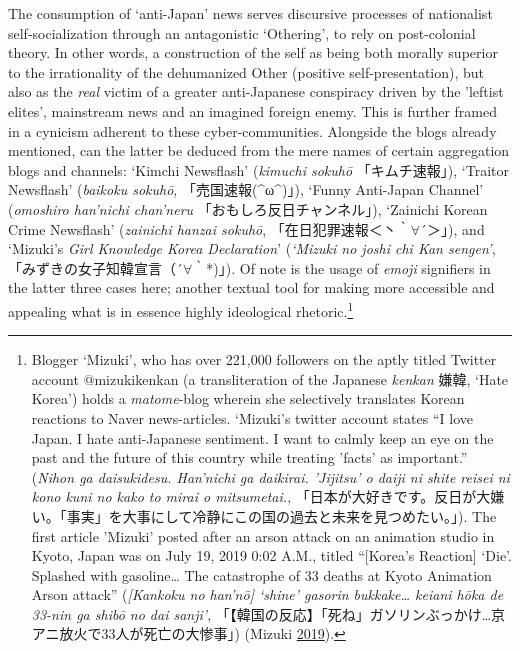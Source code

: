 \documentclass[10pt,british,A4paper,twoside]{memoir}
\begin{document}
The consumption of `anti-Japan' news serves discursive processes of
nationalist self-socialization through an antagonistic `Othering', to
rely on post-colonial theory. In other words, a construction of the self
as being both morally superior to the irrationality of the dehumanized
Other (positive self-presentation), but also as the \emph{real} victim
of a greater anti-Japanese conspiracy driven by the 'leftist elites', mainstream news and an imagined foreign enemy. This is
further framed in a cynicism adherent to these cyber-communities.
Alongside the blogs already mentioned, can the latter be deduced from
the mere names of certain aggregation blogs and channels: `Kimchi
Newsflash' (\emph{kimuchi sokuhō} 「キムチ速報」), `Traitor Newsflash'
(\emph{baikoku sokuhō}, 「売国速報(\^{}ω\^{})」), `Funny Anti-Japan
Channel' (\emph{omoshiro han'nichi chan'neru}
「おもしろ反日チャンネル」), `Zainichi Korean Crime Newsflash'
(\emph{zainichi hanzai sokuhō}, 「在日犯罪速報＜丶｀\(\forall\)´＞」),
and `Mizuki's \emph{Girl Knowledge Korea Declaration}' (\emph{`Mizuki no
joshi chi Kan sengen'}, 「みずきの女子知韓宣言（´\(\forall\)｀*)」). Of
note is the usage of \emph{emoji} signifiers in the latter three cases
here; another textual tool for making more accessible and appealing what
is in essence highly ideological rhetoric.\footnote{Blogger `Mizuki',
  who has over 221,000 followers on the aptly titled Twitter account
  @mizukikenkan (a transliteration of the Japanese \emph{kenkan} 嫌韓,
  `Hate Korea') holds a \emph{matome}-blog wherein she selectively
  translates Korean reactions to Naver news-articles. `Mizuki's twitter
  account states ``I love Japan. I hate anti-Japanese sentiment. I want
  to calmly keep an eye on the past and the future of this country while
  treating 'facts' as important.'' (\emph{Nihon ga daisukidesu.
  Han'nichi ga daikirai. 'Jijitsu' o daiji ni shite reisei ni kono kuni
  no kako to mirai o mitsumetai.},
  「日本が大好きです。反日が大嫌い。「事実」を大事にして冷静にこの国の過去と未来を見つめたい。」).
  The first article 'Mizuki' posted after an arson attack on an
  animation studio in Kyoto, Japan was on July 19, 2019 0:02 A.M.,
  titled ``{[}Korea's Reaction{]} `Die'. Splashed with gasoline\ldots{}
  The catastrophe of 33 deaths at Kyoto Animation Arson attack''
  (\emph{{[}Kankoku no han'nō{]} `shine' gasorin bukkake\ldots{} keiani
  hōka de 33-nin ga shibō no dai sanji'},
  「【韓国の反応】「死ね」ガソリンぶっかけ\ldots{}京アニ放火で33人が死亡の大惨事」)
  (Mizuki \protect\hyperlink{ref-mizuki_eng._2019}{2019}).}
\end{document}
